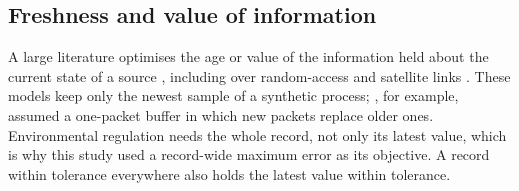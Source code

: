 \subsection{Freshness and value of information}
A large literature optimises the age or value of the information held about the current state of a source \citep{yates2021}, including over random-access and satellite links \citep{chen2021,talli2026,ramachandran2026}. These models keep only the newest sample of a synthetic process; \citet{chen2021}, for example, assumed a one-packet buffer in which new packets replace older ones. Environmental regulation needs the whole record, not only its latest value, which is why this study used a record-wide maximum error as its objective. A record within tolerance everywhere also holds the latest value within tolerance.
